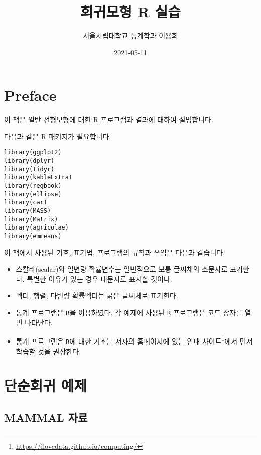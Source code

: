 \documentclass[
]{book}
\title{회귀모형 R 실습}
\author{서울시립대학교 통계학과 이용희}
\date{2021-05-11}
\makeatletter
\providecommand{\tightlist}{%
  \setlength{\itemsep}{0pt}\setlength{\parskip}{0pt}}
\renewcommand{\href}[2]{#2\footnote{\url{#1}}}
\newenvironment{kframe}{%
\medskip{}
\setlength{\fboxsep}{.8em}
 \def\at@end@of@kframe{}%
 \ifinner\ifhmode%
  \def\at@end@of@kframe{\end{minipage}}%
  \begin{minipage}{\columnwidth}%
 \fi\fi%
 \def\FrameCommand##1{\hskip\@totalleftmargin \hskip-\fboxsep
 \colorbox{shadecolor}{##1}\hskip-\fboxsep
     \hskip-\linewidth \hskip-\@totalleftmargin \hskip\columnwidth}%
 \MakeFramed {\advance\hsize-\width
   \@totalleftmargin\z@ \linewidth\hsize
   \@setminipage}}%
 {\par\unskip\endMakeFramed%
 \at@end@of@kframe}
\newenvironment{rmdblock}[1]
  {
  \begin{itemize}
  \renewcommand{\labelitemi}{
    \raisebox{-.7\height}[0pt][0pt]{
      {\setkeys{Gin}{width=3em,keepaspectratio}\texttt{[image: images/\#1]}}
    }
  }
  \setlength{\fboxsep}{1em}
  \begin{kframe}
  \item
  }
  {
  \end{kframe}
  \end{itemize}
  }
\newenvironment{rmdimportant}
  {\begin{rmdblock}{important}}
  {\end{rmdblock}}
\makeatother
\begin{document}
\maketitle

{
\setcounter{tocdepth}{1}
\tableofcontents
}
\hypertarget{preface}{%
\chapter*{Preface}\label{preface}}


이 책은 일반 선형모형에 대한 R 프로그램과 결과에 대하여 설명합니다.

다음과 같은 R 패키지가 필요합니다.

\begin{verbatim}
library(ggplot2)
library(dplyr)
library(tidyr)
library(kableExtra)
library(regbook)
library(ellipse)
library(car)
library(MASS)
library(Matrix)
library(agricolae)
library(emmeans)
\end{verbatim}

\begin{rmdimportant}
이 책에서 사용된 기호, 표기법, 프로그램의 규칙과 쓰임은 다음과 같습니다.

\begin{itemize}
\tightlist
\item
  스칼라(scalar)와 일변량 확률변수는 일반적으로 보통 글씨체의 소문자로 표기한다. 특별한 이유가 있는 경우 대문자로 표시할 것이다.
\item
  벡터, 행렬, 다변량 확률벡터는 굵은 글씨체로 표기한다.
\item
  통계 프로그램은 \texttt{R}을 이용하였다. 각 예제에 사용된 \texttt{R} 프로그램은 코드 상자를 열면 나타난다.
\item
  통계 프로그램은 \texttt{R}에 대한 기초는 저자의 홈페이지에 있는 \href{https://ilovedata.github.io/computing/}{안내 사이트}에서 먼저 학습할 것을 권장한다.
\end{itemize}
\end{rmdimportant}

\hypertarget{chap02}{%
\chapter{단순회귀 예제}\label{chap02}}

\hypertarget{mammal-uxc790uxb8cc}{%
\section{MAMMAL 자료}\label{mammal-uxc790uxb8cc}}
\end{document}
